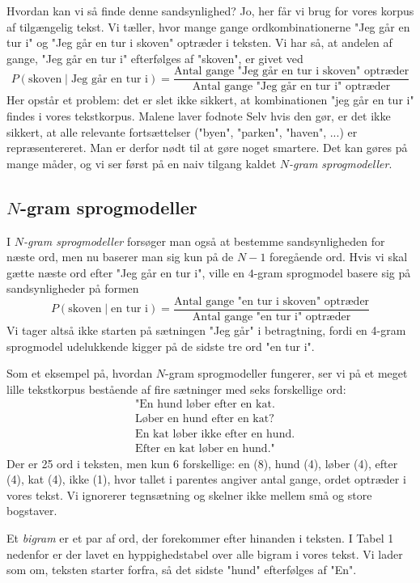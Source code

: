 \documentclass{article}
\newcommand{\am}[1]{{\color{red} #1}}
\begin{document}
Hvordan kan vi så finde denne sandsynlighed? Jo, her får vi brug for vores korpus af tilgængelig tekst. Vi tæller, hvor mange gange ordkombinationerne "Jeg går en tur i" og "Jeg går en tur i skoven" optræder i teksten. Vi har så, at andelen af gange, "Jeg går en tur i" efterfølges af "skoven", er givet ved
$$P(\text{skoven} \mid \text{Jeg går en tur i})=\frac{\text{Antal gange "Jeg går en tur i skoven" optræder}}{\text{Antal gange "Jeg går en tur i" optræder}}$$
Her opstår et problem: det er slet ikke sikkert, at kombinationen "jeg går en tur i" findes i vores tekstkorpus.\am{Malene laver fodnote} Selv hvis den gør, er det ikke sikkert, at alle relevante fortsættelser ("byen", "parken", "haven", ...) er repræsentereret. Man er derfor nødt til at gøre noget smartere. Det kan gøres på mange måder, og vi ser først på en naiv tilgang kaldet \emph{$N$-gram sprogmodeller}. 

\subsection*{$N$-gram sprogmodeller}
I \emph{$N$-gram sprogmodeller} forsøger man også at bestemme sandsynligheden for næste ord, men nu baserer man sig kun på de $N-1$ foregående ord. Hvis vi skal gætte næste ord efter "Jeg går en tur i", ville en $4$-gram sprogmodel basere sig på sandsynligheder på formen
$$P(\text{skoven} \mid \text{en tur i})=\frac{\text{Antal gange "en tur i skoven" optræder}}{\text{Antal gange "en tur i" optræder}}$$
Vi tager altså ikke starten på sætningen "Jeg går" i betragtning, fordi en 4-gram sprogmodel udelukkende kigger på de sidste tre ord "en tur i".

Som et eksempel på, hvordan $N$-gram sprogmodeller fungerer, ser vi på 
 et meget lille tekstkorpus bestående af fire sætninger med seks forskellige ord:
\begin{align*}
&\text{"En hund løber efter en kat.}\\
&\text{Løber en hund efter en kat?}\\
&\text{En kat løber ikke efter en hund.}\\
&\text{Efter en kat løber en hund."}
\end{align*}
Der er 25 ord i teksten, men kun 6 forskellige: 
en (8), hund (4), løber (4), efter (4), kat (4), ikke (1), hvor tallet i parentes angiver antal gange, ordet optræder i vores tekst. Vi ignorerer tegnsætning og skelner ikke mellem små og store  bogstaver.

Et \emph{bigram} er et par af ord, der forekommer efter hinanden i teksten. I Tabel 1 nedenfor er der lavet en hyppighedstabel over alle bigram i vores tekst. Vi  lader som om, teksten starter forfra, så det sidste "hund" efterfølges af "En".
\end{document}
